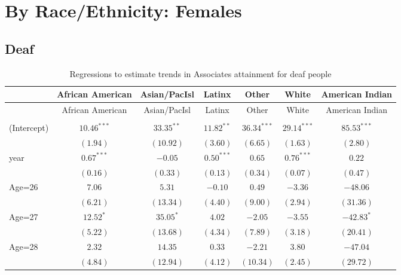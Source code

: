\documentclass[fullpage]{paper}
\begin{document}
\section{ By Race/Ethnicity: Females }

\subsection{ Deaf }

\begin{center}
\begin{longtable}{l c c c c c c }
\hline
 & African American & Asian/PacIsl & Latinx & Other & White & American Indian \\
\hline
\endfirsthead
\hline
 & African American & Asian/PacIsl & Latinx & Other & White & American Indian \\
\hline
\endhead
\hline
\endfoot
\hline
\multicolumn{7}{l}{\scriptsize{$^{***}p<0.001$, $^{**}p<0.01$, $^*p<0.05$}}\\
\caption{Regressions to estimate trends in Associates attainment for deaf people}
\label{table:coefficients}
\endlastfoot
(Intercept) & $10.46^{***}$ & $33.35^{**}$ & $11.82^{**}$ & $36.34^{***}$ & $29.14^{***}$ & $85.53^{***}$  \\
            & $(1.94)$      & $(10.92)$    & $(3.60)$     & $(6.65)$      & $(1.63)$      & $(2.80)$       \\
year        & $0.67^{***}$  & $-0.05$      & $0.50^{***}$ & $0.65$        & $0.76^{***}$  & $0.22$         \\
            & $(0.16)$      & $(0.33)$     & $(0.13)$     & $(0.34)$      & $(0.07)$      & $(0.47)$       \\
Age=26      & $7.06$        & $5.31$       & $-0.10$      & $0.49$        & $-3.36$       & $-48.06$       \\
            & $(6.21)$      & $(13.34)$    & $(4.40)$     & $(9.00)$      & $(2.94)$      & $(31.36)$      \\
Age=27      & $12.52^{*}$   & $35.05^{*}$  & $4.02$       & $-2.05$       & $-3.55$       & $-42.83^{*}$   \\
            & $(5.22)$      & $(13.68)$    & $(4.34)$     & $(7.89)$      & $(3.18)$      & $(20.41)$      \\
Age=28      & $2.32$        & $14.35$      & $0.33$       & $-2.21$       & $3.80$        & $-47.04$       \\
            & $(4.84)$      & $(12.94)$    & $(4.12)$     & $(10.34)$     & $(2.45)$      & $(29.72)$      \\

\end{longtable}
\end{center}
\end{document}
